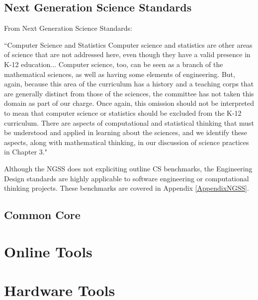 \subsection{Next Generation Science Standards}
From Next Generation Science Standards: 
\begin{blockquote}
``Computer Science and Statistics Computer science and statistics are other areas of science that are not addressed here, even though they have a valid presence in K-12 education... Computer science, too, can be seen as a branch of the mathematical sciences, as well as having some elements of engineering. But, again, because this area of the curriculum has a history and a teaching corps that are generally distinct from those of the sciences, the committee has not taken this domain as part of our charge. Once again, this omission should not be interpreted to mean that computer science or statistics should be excluded from the K-12 curriculum. There are aspects of computational and statistical thinking that must be understood and applied in learning about the sciences, and we identify these aspects, along with mathematical thinking, in our discussion of science practices in Chapter 3." 
\end{blockquote}\par
Although the NGSS does not expliciting outline CS benchmarks, the Engineering Design standards are highly applicable to software engineering or computational thinking projects. These benchmarks are covered in Appendix \ref{AppendixNGSS}.
\subsection{Common Core}
\section{Online Tools}
\section{Hardware Tools}